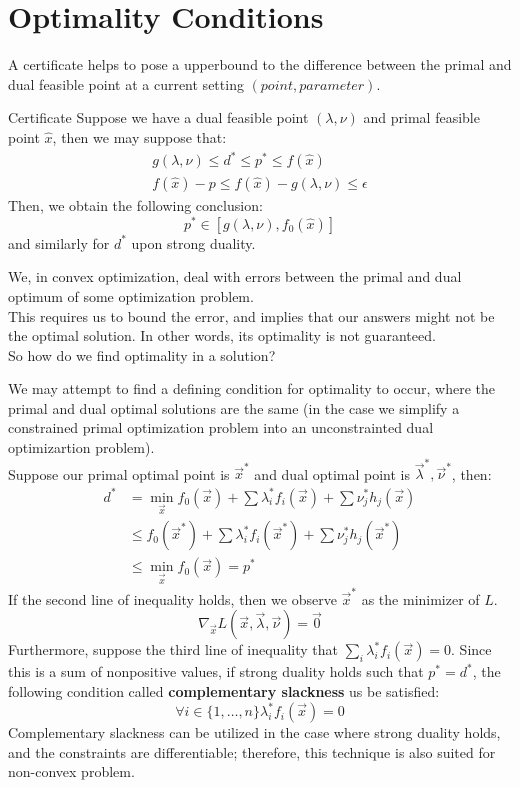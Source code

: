 \section{Optimality Conditions}
A certificate helps to pose a upperbound to the difference between the primal and dual feasible point at a current setting $(point, parameter)$.
\begin{ln-define}{Certificate}{}
    Suppose we have a dual feasible point $(\lambda, \nu)$ and primal feasible point $\hat{x}$, then we may suppose that:
    \begin{align*}
        g (\lambda, \nu) \leq d^* \leq p^* \leq f(\hat{x}) \\
        f(\hat{x}) - p \leq f(\hat{x}) - g(\lambda, \nu) \leq \epsilon
    \end{align*}
    Then, we obtain the following conclusion:
    \[
        p^* \in [g(\lambda, \nu), f_0 (\hat{x})]
    \]
    and similarly for $d^*$ upon strong duality.
\end{ln-define}
We, in convex optimization, deal with errors between the primal and dual optimum of some optimization problem. \\
This requires us to bound the error, and implies that our answers might not be the optimal solution. In other words, its optimality is not guaranteed. \\
So how do we find optimality in a solution?

We may attempt to find a defining condition for optimality to occur, where the primal and dual optimal solutions are the same (in the case we simplify a constrained primal optimization problem into an unconstrainted dual optimizartion problem). \\
Suppose our primal optimal point is $\vec{x}^*$ and dual optimal point is $\vec{\lambda}^*, \vec{\nu}^*$, then:
\begin{align*}
    d^* &= \min_{\vec{x}} f_0 (\vec{x}) + \sum \lambda_i^* f_i (\vec{x}) + \sum \nu_j^* h_j (\vec{x}) \\
    &\leq f_0 (\vec{x}^*) + \sum \lambda_i^* f_i (\vec{x}^*) + \sum \nu_j^* h_j (\vec{x}^*) \\
    &\leq \min_{\vec{x}} f_0 (\vec{x}) = p^*
\end{align*}
If the second line of inequality holds, then we observe $\vec{x}^*$ as the minimizer of $L$.
\[
    \nabla_{\vec{x}} L(\vec{x}, \vec{\lambda}, \vec{\nu}) = \vec{0}
\]
Furthermore, suppose the third line of inequality that $\sum_i \lambda_i^* f_i(\vec{x}) = 0$.
Since this is a sum of nonpositive values, if strong duality holds such that $p^* = d^*$, the following condition called \textbf{complementary slackness} us be satisfied:
\[
    \forall i \in \{1, \dots, n\} \lambda_i^* f_i(\vec{x}) = 0
\]
Complementary slackness can be utilized in the case where strong duality holds, and the constraints are differentiable; therefore, this technique is also suited for non-convex problem.

